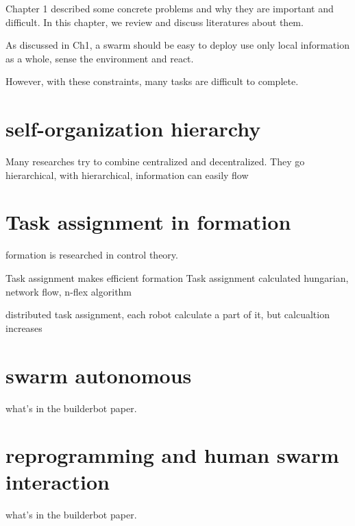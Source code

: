 




Chapter 1 described some concrete problems and why they are important and difficult.
In this chapter, we review and discuss literatures about them.

As discussed in Ch1, a swarm should be
    easy to deploy
    use only local information
    as a whole, sense the environment and react.

However, with these constraints, many tasks are difficult to complete.

\section{self-organization hierarchy}

Many researches try to combine centralized and decentralized.
They go hierarchical, with hierarchical, information can easily flow

\section{Task assignment in formation}

formation is researched in control theory.

Task assignment makes efficient formation
Task assignment calculated hungarian, network flow, n-flex algorithm

distributed task assignment, each robot calculate a part of it, but calcualtion increases

\section{swarm autonomous}

what's in the builderbot paper.

\section{reprogramming and human swarm interaction}

what's in the builderbot paper.


